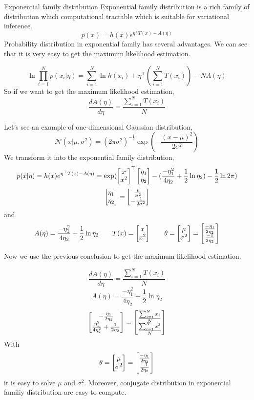     \begin{frame}[allowframebreaks]{Exponential family distribution}
    Exponential family distribution is a rich family of distribution which computational tractable which is suitable for variational inference.
    $$p(x) = h(x) e^{\eta^\top T(x) - A(\eta)}$$
    Probability distribution in exponential family has several advantages. We can see that it is very easy to get the maximum likelihood estimation.
    
    $$\ln \prod_{i=1}^N p(x_i | \eta) = \sum_{i=1}^N \ln h(x_i) + \eta^\top (\sum_{i=1}^N T(x_i)) - N A(\eta)$$
    So if we want to get the maximum likelihood estimation,
    $$\frac{dA(\eta)}{d \eta} = \frac{\sum_{i=1}^N T(x_i)}{N}$$
    
    \framebreak
    
    Let's see an example of one-dimensional Gaussian distribution,
    $$\mathcal{N}(x | \mu, \sigma^2) = (2 \pi \sigma^2)^{-\frac{1}{2}} \exp(-\frac{(x - \mu)^2}{2 \sigma^2})$$
    We transform it into the exponential family distribution,
    $$p(x | \eta) = h(x) e^{\eta^\top T(x) - A(\eta)} = \exp(\begin{bmatrix}x \\ x^2\end{bmatrix}^\top \begin{bmatrix}\eta_1 \\ \eta_2\end{bmatrix} - (\frac{-\eta_1^2}{4\eta_2} + \frac{1}{2}\ln \eta_2) - \frac{1}{2} \ln 2\pi)$$
    $$\begin{bmatrix}\eta_1 \\ \eta_2\end{bmatrix} = \begin{bmatrix}\frac{\mu}{\sigma^2} \\ -\frac{1}{2\sigma^2}\end{bmatrix}$$
    and 
    $$A(\eta) = \frac{-\eta_1^2}{4\eta_2} + \frac{1}{2}\ln \eta_2 \qquad T(x) = \begin{bmatrix}x \\ x^2\end{bmatrix} \qquad \theta = \begin{bmatrix}\mu \\ \sigma^2\end{bmatrix} = \begin{bmatrix}\frac{-\eta_1}{2\eta_2} \\ \frac{-1}{2\eta_2}\end{bmatrix}$$
    
    \framebreak
    
    Now we use the previous conclusion to get the maximum likelihood estimation.
    
    $$\frac{dA(\eta)}{d \eta} = \frac{\sum_{i=1}^N T(x_i)}{N}$$
    $$A(\eta) = \frac{-\eta_1^2}{4\eta_2} + \frac{1}{2}\ln \eta_2$$
    $$\begin{bmatrix}-\frac{\eta_1}{2\eta_2} \\ \frac{\eta_1^2}{4\eta_2^2} + \frac{1}{2\eta_2}\end{bmatrix} = \begin{bmatrix}\frac{\sum_{i=1}^N x_i}{N} \\ \frac{\sum_{i=1}^N x_i^2}{N}\end{bmatrix}$$
    With 
    $$\theta = \begin{bmatrix}\mu \\ \sigma^2\end{bmatrix} = \begin{bmatrix}\frac{-\eta_1}{2\eta_2} \\ \frac{-1}{2\eta_2}\end{bmatrix}$$
    it is easy to solve $\mu$ and $\sigma^2$.
    Moreover, conjugate distribution in exponential familiy distribution are easy to compute.
    

\end{frame}
